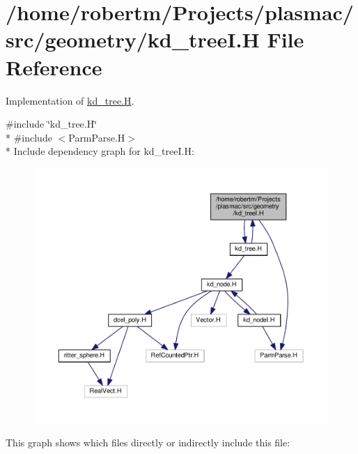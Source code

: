 \hypertarget{kd__treeI_8H}{}\section{/home/robertm/\+Projects/plasmac/src/geometry/kd\+\_\+treeI.H File Reference}
\label{kd__treeI_8H}


Implementation of \hyperlink{kd__tree_8H}{kd\+\_\+tree.\+H}.  


{\ttfamily \#include \char`\"{}kd\+\_\+tree.\+H\char`\"{}}\\*
{\ttfamily \#include $<$Parm\+Parse.\+H$>$}\\*
Include dependency graph for kd\+\_\+tree\+I.\+H\+:\nopagebreak
\begin{figure}[H]
\begin{center}
\leavevmode
\includegraphics[width=350pt]{kd__treeI_8H__incl}
\end{center}
\end{figure}
This graph shows which files directly or indirectly include this file\+:\nopagebreak
